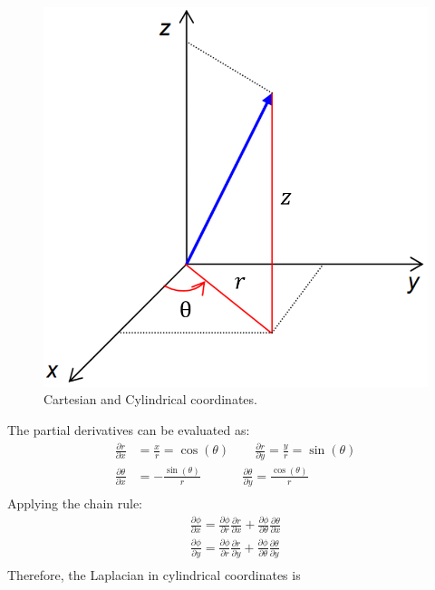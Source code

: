 \documentclass{homework}
\begin{document}
\begin{figure}[h]
    \begin{center}
    \includegraphics[scale = 0.25]{media/Cylindrical-Coordinates.png}
    \caption{Cartesian and Cylindrical coordinates.}
    \end{center}
\end{figure}
\noindent
The partial derivatives can be evaluated as:
\begin{align*}
\frac{\partial r}{\partial x} &= \frac{x}{r} = \cos(\theta) \qquad \frac{\partial r}{\partial y} = \frac{y}{r} = \sin(\theta) \\
\frac{\partial \theta}{\partial x} &= -\frac{\sin(\theta)}{r} \qquad \quad \; \frac{\partial \theta}{\partial y} = \frac{\cos(\theta)}{r} \\
\end{align*}
\noindent
Applying the chain rule:
\begin{align*}
\frac{\partial \phi}{\partial x} = \frac{\partial \phi}{\partial r} \frac{\partial r}{\partial x} + \frac{\partial \phi}{\partial \theta} \frac{\partial \theta}{\partial x}\\
\frac{\partial \phi}{\partial y} = \frac{\partial \phi}{\partial r} \frac{\partial r}{\partial y} + \frac{\partial \phi}{\partial \theta} \frac{\partial \theta}{\partial y}\\
\end{align*}
\noindent
Therefore, the Laplacian in cylindrical coordinates is
\end{document}

